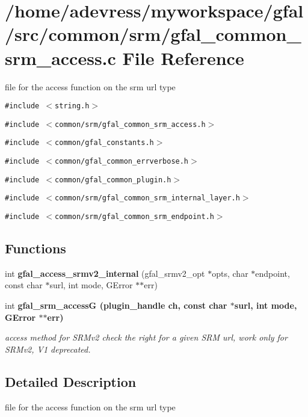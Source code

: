 \section{/home/adevress/myworkspace/gfal/src/common/srm/gfal\_\-common\_\-srm\_\-access.c File Reference}
\label{gfal__common__srm__access_8c}
file for the access function on the srm url type 

{\tt \#include $<$string.h$>$}\par
{\tt \#include $<$common/srm/gfal\_\-common\_\-srm\_\-access.h$>$}\par
{\tt \#include $<$common/gfal\_\-constants.h$>$}\par
{\tt \#include $<$common/gfal\_\-common\_\-errverbose.h$>$}\par
{\tt \#include $<$common/gfal\_\-common\_\-plugin.h$>$}\par
{\tt \#include $<$common/srm/gfal\_\-common\_\-srm\_\-internal\_\-layer.h$>$}\par
{\tt \#include $<$common/srm/gfal\_\-common\_\-srm\_\-endpoint.h$>$}\par
\subsection*{Functions}
\begin{CompactItemize}
\item 
int \textbf{gfal\_\-access\_\-srmv2\_\-internal} (gfal\_\-srmv2\_\-opt $\ast$opts, char $\ast$endpoint, const char $\ast$surl, int mode, GError $\ast$$\ast$err)\label{gfal__common__srm__access_8c_482394e183f4026d547f17575dc4b8dd}

\item 
int \bf{gfal\_\-srm\_\-access\-G} (plugin\_\-handle ch, const char $\ast$surl, int mode, GError $\ast$$\ast$err)
\begin{CompactList}\small\item\em access method for SRMv2 check the right for a given SRM url, work only for SRMv2, V1 deprecated. \item\end{CompactList}\end{CompactItemize}


\subsection{Detailed Description}
file for the access function on the srm url type 

